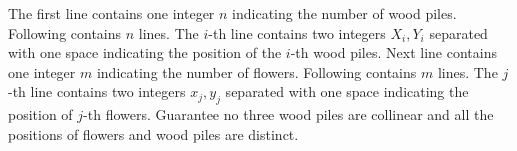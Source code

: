 The first line contains one integer $n$ indicating the number of  wood piles.
Following contains $n$ lines.
The $i$-th line contains two integers $X_i,Y_i$ 
separated with one space indicating the position of the $i$-th wood piles.
Next line contains one integer $m$ indicating the number of flowers.
Following contains $m$ lines.
The $j$-th line contains two integers $x_j,y_j$ 
separated with one space indicating the position of $j$-th flowers.
Guarantee no three wood piles are collinear and all the positions of 
flowers and wood piles are distinct.

